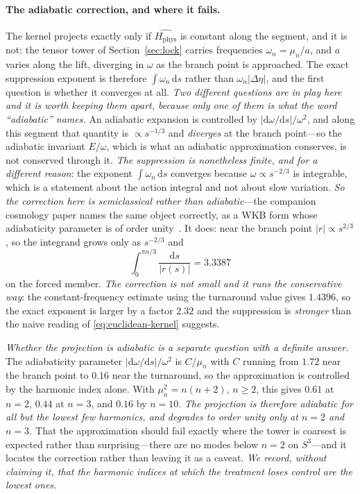 \documentclass[11pt,a4paper]{article}
\theoremstyle{plain}
\theoremstyle{definition}
\theoremstyle{remark}
\newcommand{\Hphys}{H_{\mathrm{phys}}}
\newcommand{\dd}{\mathrm{d}}   %
\begin{document}
\paragraph{The adiabatic correction, and where it fails.} The kernel projects exactly only if
$\hat{\Hphys}$ is constant along the segment, and it is not: the tensor tower of Section~\ref{sec:lock} carries
frequencies $\omega_{n}=\mu_{n}/a$, and $a$ varies along the lift, diverging in $\omega$ as the branch point is
approached. The exact suppression exponent is therefore $\int\omega_{n}\,\dd s$ rather than
$\omega_{n}\lvert\Delta\eta\rvert$, and the first question is whether it converges at all. \emph{Two different questions are in play here and it is worth keeping them apart, because only one of them is what the word \textup{``}adiabatic\textup{''} names.} An adiabatic expansion is controlled by $\lvert\dd\omega/\dd s\rvert/\omega^{2}$, and along this segment that quantity is $\propto s^{-1/3}$ and \emph{diverges} at the branch point---so the adiabatic invariant $E/\omega$, which is what an adiabatic approximation conserves, is not conserved through it. \emph{The suppression is nonetheless finite, and for a different reason}: the exponent $\int\omega_{n}\,\dd s$ converges because $\omega\propto s^{-2/3}$ is integrable, which is a statement about the action integral and not about slow variation. \emph{So the correction here is semiclassical rather than adiabatic}---the companion cosmology paper names the same object correctly, as a WKB form whose adiabaticity parameter is of order unity~\cite{JanzenCRcosmology}. It does: near the
branch point $\lvert r\rvert\propto s^{2/3}$, so the integrand grows only as $s^{-2/3}$ and
\begin{equation}
\int_{0}^{\pi\alpha/3}\frac{\dd s}{\lvert r(s)\rvert}=3.3387
\label{eq:adiabatic-exponent}
\end{equation}
on the forced member. \emph{The correction is not small and it runs the
conservative way}: the constant-frequency estimate using the turnaround value gives $1.4396$, so
the exact exponent is larger by a factor $2.32$ and the suppression is \emph{stronger} than the naive reading
of \eqref{eq:euclidean-kernel} suggests.

\emph{Whether the projection is adiabatic is a separate question with a definite answer.} The adiabaticity
parameter $\lvert\dd\omega/\dd s\rvert/\omega^{2}$ is $C/\mu_{n}$ with $C$ running from $1.72$ near the branch
point to $0.16$ near the turnaround, so the approximation is controlled by the harmonic index alone. With
$\mu_{n}^{2}=n(n+2)$, $n\ge2$, this gives $0.61$ at $n=2$, $0.44$ at $n=3$, and $0.16$ by $n=10$.
\emph{The projection is therefore adiabatic for all but the lowest few harmonics, and degrades to order unity
only at $n=2$ and $n=3$.} That the approximation should fail exactly where the tower is coarsest is expected
rather than surprising---there are no modes below $n=2$ on $S^{3}$---and it locates the correction rather than
leaving it as a caveat. \emph{We record, without claiming it, that the harmonic indices at which the treatment
loses control are the lowest ones.}
\end{document}
